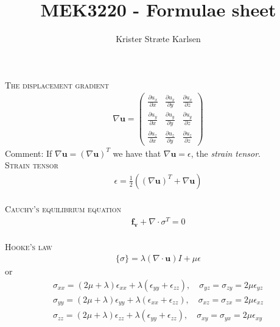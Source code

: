 \documentclass[11pt,a4paper,english]{article}
\title{MEK3220 - Formulae sheet}
\author{Krister Stræte Karlsen}
\begin{document}
\maketitle

{\scshape The displacement gradient} \\

\begin{align*}
\nabla \mathbf{u} = 
\begin{pmatrix}	    \frac{\partial u_x}{ \partial x} & \frac{\partial u_x}{ \partial y} & \frac{\partial u_x}{ \partial z}      \\
                		\frac{\partial u_y}{ \partial x} & \frac{\partial u_y}{ \partial y} & \frac{\partial u_y}{ \partial z}     \\
               	 	\frac{\partial u_z}{ \partial x} & \frac{\partial u_z}{ \partial y} &\frac{\partial u_z}{ \partial z}     
\end{pmatrix}
\end{align*}
\hspace{1cm} Comment: If $ \nabla \mathbf{u} =  ( \nabla \mathbf{u})^T  $ we have that $\nabla \mathbf{u} = \epsilon $, the \emph{strain tensor}.
\\[2ex] 

{\scshape Strain tensor} \\
\begin{align*}
\epsilon = \frac{1}{2}( (\nabla \mathbf{u} )^T + \nabla \mathbf{u}  ) 
\end{align*}
\\[2ex] 

{\scshape Cauchy's equilibrium equation} \\
\begin{align*}
\mathbf{f_v} + \nabla \cdot \sigma^T = 0
\end{align*}
\\[2ex]

{\scshape Hooke's law} \\
\begin{align*}
\{\sigma \} = \lambda (\nabla \cdot \mathbf{u}) I + \mu \epsilon
\end{align*}
\hspace{1cm} or
\begin{align*}
\sigma_{xx} = (2\mu + \lambda) \epsilon_{xx} + \lambda (\epsilon_{yy} + \epsilon_{zz}), \quad \sigma_{yz} = \sigma_{zy} = 2 \mu \epsilon_{yz} \\
\sigma_{yy} = (2\mu + \lambda) \epsilon_{yy} + \lambda (\epsilon_{xx} + \epsilon_{zz}), \quad \sigma_{xz} = \sigma_{zx} = 2 \mu \epsilon_{xz}  \\
\sigma_{zz} = (2\mu + \lambda) \epsilon_{zz} + \lambda (\epsilon_{yy} + \epsilon_{zz}), \quad \sigma_{xy} = \sigma_{yx} = 2 \mu \epsilon_{xy} 
\end{align*}
\\[2ex]
\end{document}
